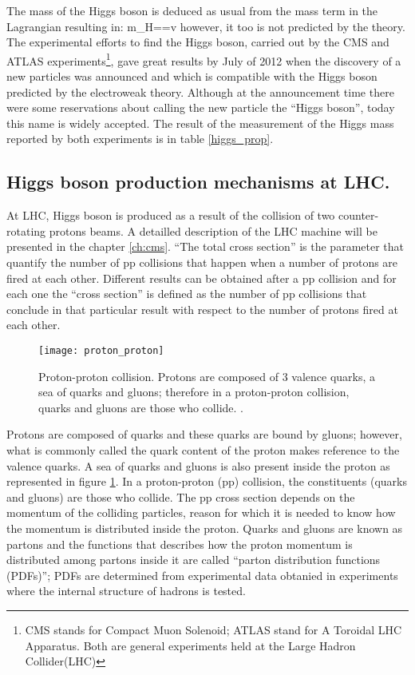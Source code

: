 \noindent The mass of the Higgs boson is deduced as usual from the mass term in the Lagrangian resulting in:
\beqn
m_H==\sqrt{2\lambda}v
\eeqn
\noindent however, it too is not predicted by the theory. The experimental efforts to find the Higgs boson, carried out by the CMS and ATLAS experiments\footnote{CMS stands for Compact Muon Solenoid; ATLAS stand for A Toroidal LHC Apparatus. Both are general experiments held at the Large Hadron Collider(LHC)}, gave great results by July of 2012 when the discovery of a new particles was announced and which is compatible with the Higgs boson predicted by the electroweak theory\cite{hcms,hatlas}. Although at the announcement time there were some reservations about calling the new particle the ``Higgs boson'', today this name is widely accepted. The result of the measurement of the Higgs mass reported by both experiments\cite{hmass} is in table \ref{higgs_prop}. 

\subsection{Higgs boson production mechanisms at LHC.}

\noindent At LHC, Higgs boson is produced as a result of the collision of two counter-rotating protons beams. A detailled description of the LHC machine will be presented in the chapter \ref{ch:cms}. ``The total cross section'' is the parameter that quantify the number of pp collisions that happen when a number of protons are fired at each other. Different results can be obtained after a pp collision and for each one the ``cross section'' is defined as the number of pp collisions that conclude in that particular result with respect to the number of protons fired at each other.
\begin{figure}[!h]
\centering
\texttt{[image: proton\_proton]}
\caption[Proton-Proton collision]{Proton-proton collision. Protons are composed of 3 valence quarks, a sea of quarks and gluons; therefore in a proton-proton collision, quarks and gluons are those who collide. \cite{pp_coll}.}
\label{pp_collision}
\end{figure}

\noindent Protons are composed of quarks and these quarks are bound by gluons; however, what is commonly called the quark content of the proton makes reference to the valence quarks. A sea of quarks and gluons is also present inside the proton as represented in figure \ref{pp_collision}. In a proton-proton (pp) collision, the constituents (quarks and gluons) are those who collide. The pp cross section depends on the momentum of the colliding particles, reason for which it is needed to know how the momentum is distributed inside the proton. Quarks and gluons are known as partons and the functions that describes how the proton momentum is distributed among partons inside it are called ``parton distribution functions (PDFs)''; PDFs are determined from experimental data obtanied in experiments where the internal structure of hadrons is tested.

